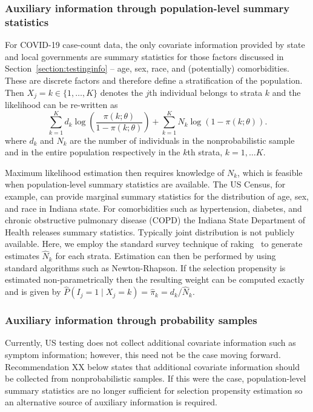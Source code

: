 \documentclass[11pt]{amsart}
\begin{document}
\subsubsection{Auxiliary information through population-level summary statistics}
\label{subsec:auxsum}

For COVID-19 case-count data, the only covariate information provided by state and local governments are summary statistics for those factors discussed in Section~\ref{section:testinginfo} -- age, sex, race, and (potentially) comorbidities.  These are discrete factors and therefore define a stratification of the population. Then $X_j = k \in \{1,\ldots,K\}$ denotes the $j$th individual belongs to strata $k$ and the likelihood can be re-written as
$$
\sum_{k=1}^K d_k \log \left( \frac{\pi (k; \theta)}{1-\pi(k; \theta)} \right) + \sum_{k=1}^K N_k \log \left( 1 - \pi (k; \theta) \right).
$$
where $d_k$ and $N_k$ are the number of individuals in the nonprobabilistic sample and in the entire population respectively in the $k$th strata, $k=1,\ldots K$.

Maximum likelihood estimation then requires knowledge of $N_k$, which is feasible when population-level summary statistics are available.  The US Census, for example, can provide marginal summary statistics for the distribution of age, sex, and race in Indiana state.  For comorbidities such as hypertension, diabetes, and chronic obstructive pulmonary disease (COPD) the Indiana State Department of Health releases summary statistics. Typically  joint distribution is not publicly available.  Here, we employ the standard survey technique of raking~\citep{deville1993} to generate estimates $\hat N_k$ for each strata.  Estimation can then be performed by using standard algorithms such as Newton-Rhapson.  If the selection propensity is estimated non-parametrically then the resulting weight can be computed exactly and is given by $\hat P(I_j = 1 \mid X_j = k) = \hat \pi_k = d_k/\hat N_k$.

\subsubsection{Auxiliary information through probability samples}
\label{subsec:auxprob}

Currently, US testing does not collect additional covariate information such as symptom information; however, this need not be the case moving forward.  Recommendation XX below states that additional covariate information should be collected from nonprobabilistic samples.  If this were the case, population-level summary statistics are no longer sufficient for selection propensity estimation so an alternative source of auxiliary information is required.
\end{document}
